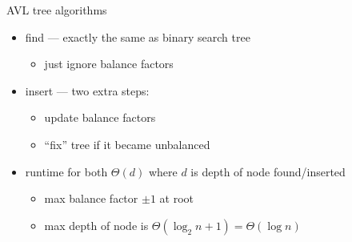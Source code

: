 \usetikzlibrary{graphs,graphdrawing}


\begin{frame}{AVL tree algorithms}
\begin{itemize}
    \item find --- exactly the same as binary search tree
        \begin{itemize}
        \item just ignore balance factors
        \end{itemize}
    \item insert --- two extra steps:
        \begin{itemize}
        \item update balance factors
        \item ``fix'' tree if it became unbalanced
        \end{itemize}
    \vspace{.5cm}
    \item<2-> runtime for both $\Theta(d)$ where $d$ is depth of node found/inserted
        \begin{itemize}
        \item max balance factor $\pm 1$ at root
        \item max depth of node is $\Theta(\log_2 n + 1) = \Theta(\log n)$
        \end{itemize}
\end{itemize} 
\end{frame}
